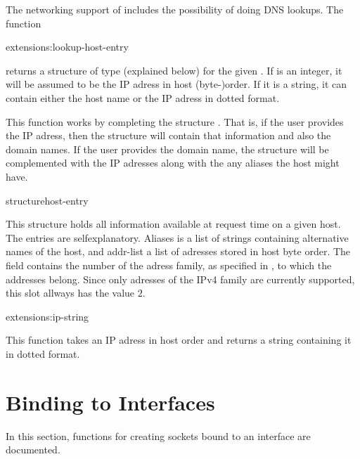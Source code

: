 The networking support of \cmucl{} includes the possibility of doing
DNS lookups. The function 

\begin{defun}{extensions:}{lookup-host-entry}{%
    }
 
  returns a structure of type  (explained below) for
  the given .  If  is an integer, it will be
  assumed to be the IP adress in host (byte-)order. If it is a string,
  it can contain either the host name or the IP adress in dotted
  format.
  
  This function works by completing the structure .
  That is, if the user provides the IP adress, then the structure will
  contain that information and also the domain names. If the user
  provides the domain name, the structure will be complemented with
  the IP adresses along with the any aliases the host might have.

\end{defun}

\newpage

\begin{deftp}{structure}{host-entry}
  
  This structure holds all information available at request time on a
  given host. The entries are selfexplanatory. Aliases is a list of
  strings containing alternative names of the host, and addr-list a
  list of adresses stored in host byte order. The field
   contains the number of the adress family, as
  specified in , to which the addresses belong. Since
  only adresses of the IPv4 family are currently supported, this slot
  allways has the value $2$.

\end{deftp}

\begin{defun}{extensions:}{ip-string}{%
    }
  
  This function takes an IP adress in host order and returns a string
  containing it in dotted format.

\end{defun}

\section{Binding to Interfaces}

In this section, functions for creating sockets bound to an interface
are documented.

